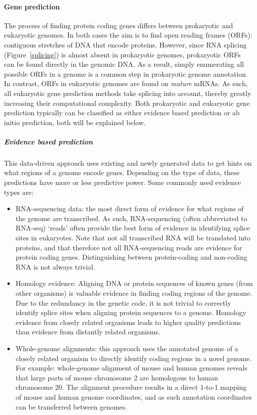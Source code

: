 \paragraph{Gene prediction}\label{Chapter1_gene_prediction}

The process of finding protein coding genes differs between prokaryotic and eukaryotic genomes.
In both cases the aim is to find open reading frames (ORFs): contiguous stretches of DNA that encode proteins.
However, since RNA splicing (Figure~\ref{splicing}) is almost absent in prokaryotic genomes, prokaryotic ORFs can be found directly in the genomic DNA.
As a result, simply enumerating all possible ORFs in a genome is a common step in prokaryotic genome annotation.
In contrast, ORFs in eukaryotic genomes are found on \textit{mature} mRNAs. As such, all eukaryotic gene prediction methods take splicing into account, thereby greatly increasing their computational complexity.
Both prokaryotic and eukaryotic gene prediction typically can be classified as either evidence based prediction or ab initio prediction, both will be explained below.

\subparagraph{Evidence based prediction}

This data-driven approach uses existing and newly generated data to get hints on what regions of a genome encode genes.
Depending on the type of data, these predictions have more or less predictive power.
Some commonly used evidence types are:

\begin{itemize}
\item RNA-sequencing data: the most direct form of evidence for what regions of the genome are transcribed.
As such, RNA-sequencing (often abbreviated to RNA-seq) `reads' often provide the best form of evidence in identifying splice sites in eukaryotes.
Note that not all transcribed RNA will be translated into proteins, and that therefore not all RNA-sequencing reads are evidence for protein coding genes.
Distinguishing between protein-coding and non-coding RNA is not always trivial.
\item Homology evidence: Aligning DNA or protein sequences of known genes (from other organisms) is valuable evidence in finding coding regions of the genome.
Due to the redundancy in the genetic code, it is not trivial to correctly identify splice sites when aligning protein sequences to a genome.
Homology evidence from closely related organisms leads to higher quality predictions than evidence from distantly related organisms.
\item Whole-genome alignments: this approach uses the annotated genome of a closely related organism to directly identify coding regions in a novel genome.
For example: whole-genome alignment of mouse and human genomes reveals that large parts of mouse chromosome 2 are homologous to human chromosome 20.
The alignment procedure results in a direct 1-to-1 mapping of mouse and human genome coordinates, and as such annotation coordinates can be transferred between genomes.
\end{itemize}

